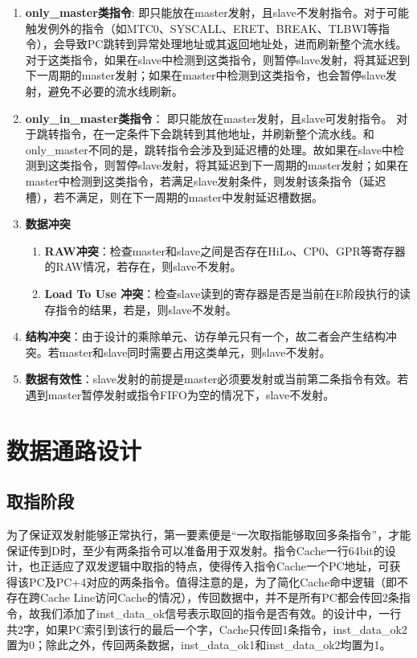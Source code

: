 \begin{enumerate}
    \item \textbf{only\_master类指令}: 即只能放在master发射，且slave不发射指令。对于可能触发例外的指令（如MTC0、SYSCALL、ERET、BREAK、TLBWI等指令），会导致PC跳转到异常处理地址或其返回地址处，进而刷新整个流水线。对于这类指令，如果在slave中检测到这类指令，则暂停slave发射，将其延迟到下一周期的master发射；如果在master中检测到这类指令，也会暂停slave发射，避免不必要的流水线刷新。
    \item \textbf{only\_in\_master类指令}： 即只能放在master发射，且slave可发射指令。 对于跳转指令，在一定条件下会跳转到其他地址，并刷新整个流水线。和only\_master不同的是，跳转指令会涉及到延迟槽的处理。故如果在slave中检测到这类指令，则暂停slave发射，将其延迟到下一周期的master发射；如果在master中检测到这类指令，若满足slave发射条件，则发射该条指令（延迟槽），若不满足，则在下一周期的master中发射延迟槽数据。
    \item \textbf{数据冲突}
    \begin{enumerate}
        \item \textbf{RAW冲突}：检查master和slave之间是否存在HiLo、CP0、GPR等寄存器的RAW情况，若存在，则slave不发射。
        \item \textbf{Load To Use 冲突}：检查slave读到的寄存器是否是当前在E阶段执行的读存指令的结果，若是，则slave不发射。
    \end{enumerate}
    \item \textbf{结构冲突}：由于设计的乘除单元、访存单元只有一个，故二者会产生结构冲突。若master和slave同时需要占用这类单元，则slave不发射。
    \item \textbf{数据有效性}：slave发射的前提是master必须要发射或当前第二条指令有效。若遇到master暂停发射或指令FIFO为空的情况下，slave不发射。
\end{enumerate}


\section{数据通路设计}
\subsection{取指阶段}
为了保证双发射能够正常执行，第一要素便是“一次取指能够取回多条指令”，才能保证传到D时，至少有两条指令可以准备用于双发射。指令Cache一行64bit的设计，也正适应了双发逻辑中取指的特点，使得\cpuname 传入指令Cache一个PC地址，可获得该PC及PC+4对应的两条指令。值得注意的是，为了简化Cache命中逻辑（即不存在跨Cache Line访问Cache的情况），传回数据中，并不是所有PC都会传回2条指令，故我们添加了inst\_data\_ok信号表示取回的指令是否有效。\cpuname 的设计中，一行共2字，如果PC索引到该行的最后一个字，Cache只传回1条指令，inst\_data\_ok2置为0；除此之外，传回两条数据，inst\_data\_ok1和inst\_data\_ok2均置为1。

